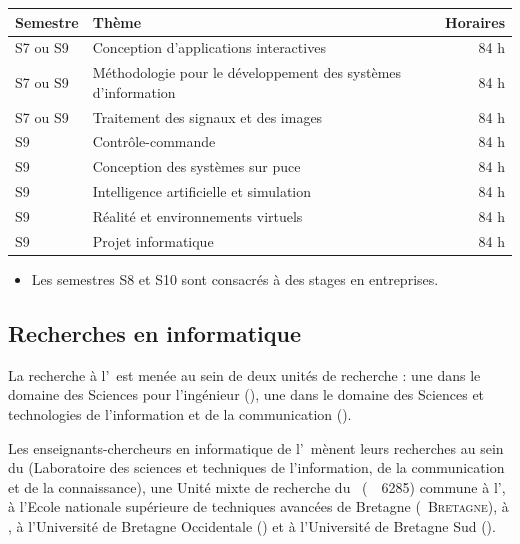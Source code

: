 \begin{longtable}{llr}
\hline
Semestre & Thème & Horaires \\
\hline
S7 ou S9 & Conception d'applications interactives 							& 84 h \\
S7 ou S9 & Méthodologie pour le développement des systèmes d'information 	& 84 h \\
S7 ou S9 & Traitement des signaux et des images 							& 84 h \\
\hline
S9 	& Contrôle-commande 						& 84 h \\
S9 	& Conception des systèmes sur puce 			& 84 h \\
S9 	& Intelligence artificielle et simulation 	& 84 h \\
S9 	& Réalité et environnements virtuels		& 84 h \\
\hline
S9 	& Projet informatique						& 84 h \\
\hline
\end{longtable}

\begin{itemize}
\item Les semestres S8 et S10 sont consacrés à des stages en entreprises. 
\end{itemize}

\subsection*{Recherches en informatique}
La recherche à l'\enib\ est menée au sein de deux unités de recherche :
une dans le domaine des Sciences pour l'ingénieur (\lbms), 
une dans le domaine des Sciences et technologies de l'information et 
de la communication (\labsticc).

Les enseignants-chercheurs en informatique de l'\enib\ mènent leurs recherches au sein du {\labsticc} 
(Laboratoire des sciences et techniques de l'information, de la communication et de la connaissance),
une Unité mixte de recherche du \cnrs\ (\cnrs\ \umr\ 6285) commune 
à l'\enib, 
à l'Ecole nationale supérieure de techniques avancées de {Bretagne} (\ensta\ \textsc{Bretagne}),
à \tb, 
à l'Université de Bretagne Occidentale (\ubo) et 
à l'Université de Bretagne Sud (\ubs).

